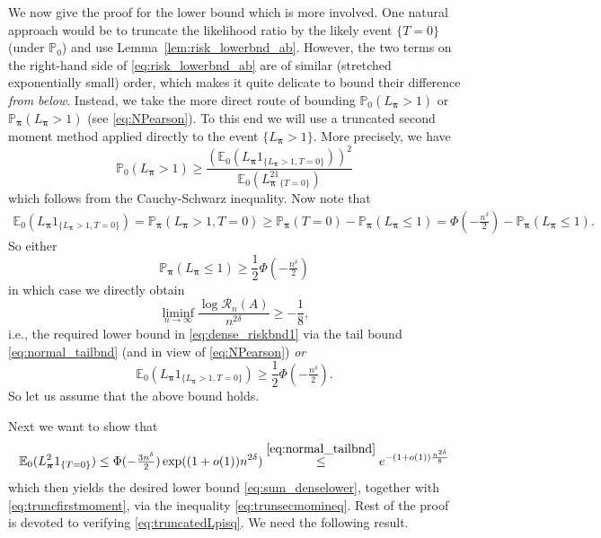 \documentclass[11pt,reqno,letterpaper]{amsart}
\numberwithin{equation}{section}
\theoremstyle{plain}
\newtheorem{lemma}[theorem]{Lemma}
\def \bpi{\boldsymbol{\pi}}
\def \E{\mathbb{E}}
\def \P{\mathbb{P}}
\begin{document}
 We now give the proof for the lower 
bound which is more involved. One natural approach would be to truncate the 
likelihood ratio by the likely event $\{T = 0\}$ (under $\P_0$) and use Lemma~\ref{lem:risk_lowerbnd_ab}. However, the two terms on 
the right-hand side of \eqref{eq:risk_lowerbnd_ab} are of similar (stretched 
exponentially small) order, which makes it quite delicate to bound their difference {\em from below}. 
Instead, we take the more direct route of bounding $\P_0(L_{\bpi} > 1)$ or 
$\P_{\bpi}(L_{\bpi} > 1)$ (see \eqref{eq:NPearson}). To this end we will use a 
truncated second moment method applied directly to the event $\{L_{\bpi} > 1\}$. 
More precisely, we have
\begin{equation}\label{eq:trunsecmomineq}
\P_0(L_{\bpi} > 1) \ge \frac{(\E_0(L_{\bpi} 1_{\{L_{\bpi} > 1, T = 0\}}))^2}{\E_0(L_{\bpi}^21_{\{T = 0\}})}
\end{equation}
which follows from the Cauchy-Schwarz inequality. Now note that
\begin{equation*}
\begin{split}
\E_0(L_{\bpi}1_{\{L_{\bpi} > 1, T = 0\}}) = \P_{\bpi}(L_{\bpi} > 1, T = 0) \ge \P_{\bpi}(T = 0) - \P_{\bpi}(L_{\bpi} \le 1) = \Phi(-\tfrac{n^{\delta}}2) - \P_{\bpi}(L_{\bpi} \le 1).
\end{split}
\end{equation*}
So either 
\begin{equation*}
\P_{\bpi}(L_{\bpi} \le 1) \ge \frac12 \Phi(-\tfrac{n^{\delta}}2)
\end{equation*}
in which case we directly obtain
\begin{equation}\label{eq:sum_denselower}
\liminf_{n\rightarrow \infty}\frac{\log{\mathcal R_n(A)}}{n^{2\delta}} \ge  -\frac18,
\end{equation}
i.e., the required lower bound in \eqref{eq:dense_riskbnd1} via the tail bound 
\eqref{eq:normal_tailbnd} (and in view of \eqref{eq:NPearson}) {\em or} 
\begin{equation}\label{eq:truncfirstmoment}
\E_0(L_{\bpi} 1_{\{L_{\bpi} > 1, T = 0\}}) \ge \frac 12\Phi(-\tfrac{n^{\delta}}2).
\end{equation}
So let us assume that the above bound holds.

Next we want to show that \begin{equation}\label{eq:truncatedLpisq}
\E_0(L_{\bpi}^21_{\{T = 0\}}) \le \Phi(-\tfrac{3n^{\delta}}2) \exp((1 + o(1)) n^{2\delta}) \stackrel{\eqref{eq:normal_tailbnd}}{\le} e^{-(1 + o(1))\frac{n^{2\delta}}8}
\end{equation}
which then yields the desired lower bound \eqref{eq:sum_denselower}, together with 
\eqref{eq:truncfirstmoment}, via the inequality \eqref{eq:trunsecmomineq}. Rest of the proof is devoted to verifying 
\eqref{eq:truncatedLpisq}. We need the following result.
\end{document}
